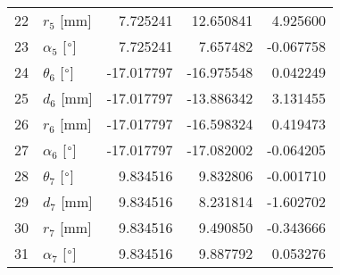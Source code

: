 \documentclass{standalone}%
\begin{document}
\begin{tabular}{llrrr}
22 &              $r_{5}$ [mm] &   7.725241 &  12.650841 &   4.925600 \\
23 &  $\alpha_{5}$ [$\degree$] &   7.725241 &   7.657482 &  -0.067758 \\
24 &  $\theta_{6}$ [$\degree$] & -17.017797 & -16.975548 &   0.042249 \\
25 &              $d_{6}$ [mm] & -17.017797 & -13.886342 &   3.131455 \\
26 &              $r_{6}$ [mm] & -17.017797 & -16.598324 &   0.419473 \\
27 &  $\alpha_{6}$ [$\degree$] & -17.017797 & -17.082002 &  -0.064205 \\
28 &  $\theta_{7}$ [$\degree$] &   9.834516 &   9.832806 &  -0.001710 \\
29 &              $d_{7}$ [mm] &   9.834516 &   8.231814 &  -1.602702 \\
30 &              $r_{7}$ [mm] &   9.834516 &   9.490850 &  -0.343666 \\
31 &  $\alpha_{7}$ [$\degree$] &   9.834516 &   9.887792 &   0.053276 \\
\bottomrule
\end{tabular}
%
\end{document}
